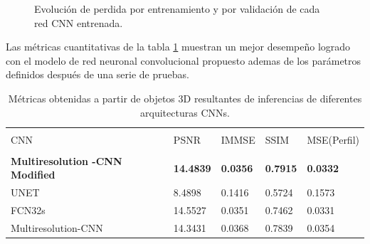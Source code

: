 \documentclass[10pt,letterpaper]{article}
\begin{document}
\begin{figure}[H]
      \begin{center}
        \caption{Evolución de perdida por entrenamiento y por validación de cada red CNN entrenada.}
        \label{tif157}
      \end{center}
\end{figure}

Las métricas cuantitativas de la tabla \ref{metricasultimate} muestran un mejor desempeño logrado con el modelo de red neuronal convolucional propuesto ademas de los parámetros definidos después de una serie de pruebas.

\begin{table}[H]
\caption{Métricas obtenidas a partir de objetos 3D resultantes de inferencias de diferentes arquitecturas CNNs.}
\begin{center}
\begin{tabular}{p{2.5cm}p{1.5cm}p{1.5cm}p{1.5cm}p{1.5cm}}
\hline\\
CNN & PSNR & IMMSE & SSIM & MSE(Perfil) \\
\hline\\
\textbf{Multiresolution -CNN Modified}  & \textbf{14.4839} & \textbf{0.0356} & \textbf{0.7915} & \textbf{0.0332}\\
UNET                & 8.4898 & 0.1416 & 0.5724 & 0.1573 \\
FCN32s              & 14.5527 & 0.0351 & 0.7462 & 0.0331 \\
Multiresolution-CNN & 14.3431 & 0.0368 & 0.7839 & 0.0354 \\[2pt]
\hline
\end{tabular}
\label{metricasultimate}
\end{center}
\end{table}
\end{document}
